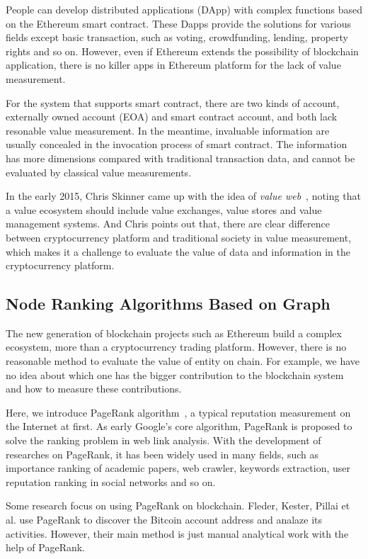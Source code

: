 People can develop distributed applications (DApp) with complex functions based on the Ethereum smart contract. These Dapps provide the solutions for various fields except basic transaction, such as voting, crowdfunding, lending, property rights and so on.
However, even if Ethereum extends the possibility of blockchain application, there is no killer apps in Ethereum platform for the lack of value measurement.

For the system that supports smart contract, there are two kinds of account, externally owned account (EOA) and smart contract account, and both lack resonable value measurement. In the meantime, invaluable information are usually concealed in the invocation process of smart contract. The information has more dimensions compared with traditional transaction data, and cannot be evaluated by classical value measurements.

In the early 2015, Chris Skinner came up with the idea of \emph{value web}~\cite{ChrisSkinner}, noting that a value ecosystem should include value exchanges, value stores and value management systems. And Chris points out that, there are clear difference between cryptocurrency platform and traditional society in value measurement, which makes it a challenge to evaluate the value of data and information in the cryptocurrency platform.

\subsection{Node Ranking Algorithms Based on Graph}
The new generation of blockchain projects such as Ethereum build a complex ecosystem, more than a cryptocurrency trading platform. However, there is no reasonable method to evaluate the value of entity on chain. For example, we have no idea about which one has the bigger contribution to the blockchain system and how to measure these contributions.

Here, we introduce PageRank algorithm~\cite{page1999pagerank}, a typical reputation measurement on the Internet at first. As early Google's core algorithm, PageRank is proposed to solve the ranking problem in web link analysis. With the development of researches on PageRank, it has been widely used in many fields, such as importance ranking of academic papers, web crawler, keywords extraction, user reputation ranking in social networks and so on.

Some research focus on using PageRank on blockchain. Fleder, Kester, Pillai et al. use PageRank to discover the Bitcoin account address and analaze its activities. However, their main method is just manual analytical work with the help of PageRank.

